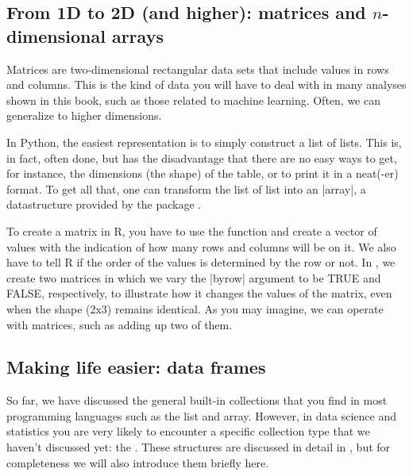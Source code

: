 \subsection{From 1D to 2D (and higher): matrices and $n$-dimensional arrays}

Matrices are two-dimensional rectangular data sets that include values
in rows and columns. This is the kind of data you will have to deal
with in many analyses shown in this book, such as those related to
machine learning. Often, we can generalize to higher dimensions.


In Python, the easiest representation is to simply construct a list of
lists. This is, in fact, often done, but has the disadvantage that
there are no easy ways to get, for instance, the dimensions (the
shape) of the table, or to print it in a neat(-er) format. To get all
that, one can transform the list of list into an |array|, a
datastructure provided by the package .

To create a matrix in R, you have to use the function  and
create a vector of values with the indication of how many rows and
columns will be on it. We also have to tell R if the order of the
values is determined by the row or not. In , we create
two matrices in which we vary the |byrow| argument to be TRUE and
FALSE, respectively, to illustrate how it changes the values of the
matrix, even when the shape (2x3) remains identical. As you may
imagine, we can operate with matrices, such as adding up two of them.



\subsection{Making life easier: data frames}

So far, we have discussed the general built-in collections that you find in most programming languages
such as the list and array.
However, in data science and statistics you are very likely to encounter a specific collection type that we haven't discussed yet: the .
These structures are discussed in detail in ,
but for completeness we will also introduce them briefly here. 

